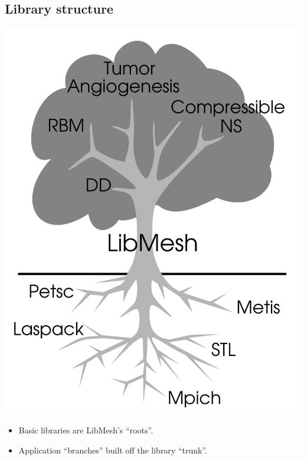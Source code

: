 \subsection*{Library structure}
\begin{frame}[t]


    \begin{minipage}[h]{.6\textwidth}
    \begin{center}
      \includegraphics[width=.9\textwidth]{figures/mytreeandroots_allnames}
    \end{center}
  \end{minipage}
  \begin{minipage}[h]{.35\textwidth}
      \begin{itemize}
    \item Basic libraries are LibMesh's ``roots''.
    \item Application ``branches'' built off the library ``trunk''.
      \end{itemize}
  \end{minipage}



\end{frame}
